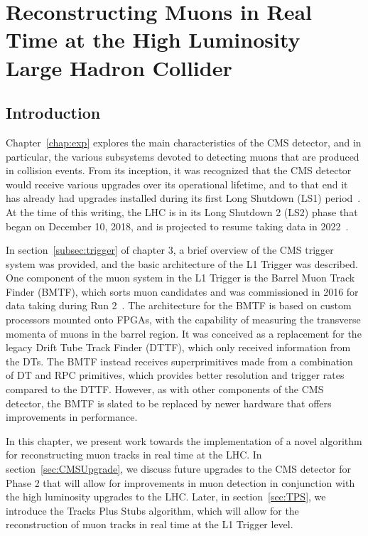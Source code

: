 
\chapter{Reconstructing Muons in Real Time at the High Luminosity Large Hadron Collider}
\label{chap:TPS}

\section{Introduction}

Chapter~\ref{chap:exp} explores the main characteristics of the CMS detector, and in particular, the various subsystems devoted to detecting muons that are produced in collision events.
From its inception, it was recognized that the CMS detector would receive various upgrades over its operational lifetime, and to that end it has already had upgrades installed during its first Long Shutdown (LS1) period~\cite{Battilana:2017mrm,Kreis:2103853}.
At the time of this writing, the LHC is in its Long Shutdown 2 (LS2) phase that began on December 10, 2018, and is projected to resume taking data in 2022~\cite{LHCsched}.

In section~\ref{subsec:trigger} of chapter 3, a brief overview of the CMS trigger system was provided, and the basic architecture of the L1 Trigger was described.
One component of the muon system in the L1 Trigger is the Barrel Muon Track Finder (BMTF), which sorts muon candidates and was commissioned in 2016 for data taking during Run 2~\cite{Ero:2102885}.
The architecture for the BMTF is based on custom processors mounted onto FPGAs, with the capability of measuring the transverse momenta of muons in the barrel region.
It was conceived as a replacement for the legacy Drift Tube Track Finder (DTTF), which only received information from the DTs.
The BMTF instead receives superprimitives made from a combination of DT and RPC primitives, which provides better resolution and trigger rates compared to the DTTF.
However, as with other components of the CMS detector, the BMTF is slated to be replaced by newer hardware that offers improvements in performance.

In this chapter, we present work towards the implementation of a novel algorithm for reconstructing muon tracks in real time at the LHC.
In section~\ref{sec:CMSUpgrade}, we discuss future upgrades to the CMS detector for Phase 2 that will allow for improvements in muon detection in conjunction with the high luminosity upgrades to the LHC.
Later, in section~\ref{sec:TPS}, we introduce the Tracks Plus Stubs algorithm, which will allow for the reconstruction of muon tracks in real time at the L1 Trigger level.

